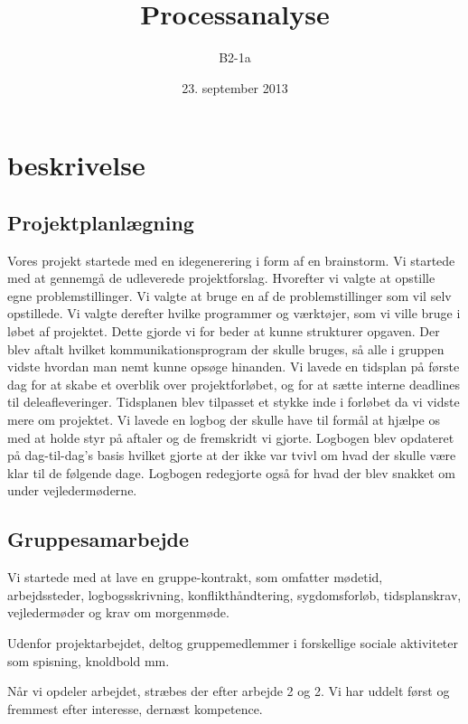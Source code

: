 


\title{Processanalyse}
\author{B2-1a}
\date{23. september 2013}
\maketitle



\section{beskrivelse}

\subsection{Projektplanlægning}

Vores projekt startede med en idegenerering i form af en brainstorm. Vi startede med at gennemgå de udleverede projektforslag. Hvorefter vi valgte at opstille egne problemstillinger. Vi valgte at bruge en af de problemstillinger som vil selv opstillede. 
Vi valgte derefter hvilke programmer og værktøjer, som vi ville bruge i løbet af projektet. Dette gjorde vi for beder at kunne strukturer opgaven.  Der blev aftalt hvilket kommunikationsprogram der skulle bruges, så alle i gruppen vidste hvordan man nemt kunne opsøge hinanden. 
Vi lavede en tidsplan på første dag for at skabe et overblik over projektforløbet, og for at sætte interne deadlines til deleafleveringer. Tidsplanen blev tilpasset et stykke inde i forløbet da vi vidste mere om projektet.
Vi lavede en logbog der skulle have til formål at hjælpe os med at holde styr på aftaler og de fremskridt vi gjorte. Logbogen blev opdateret på dag-til-dag’s basis hvilket gjorte at der ikke var tvivl om hvad der skulle være klar til de følgende dage. Logbogen redegjorte også for hvad der blev snakket om under vejledermøderne. 

\subsection{Gruppesamarbejde}

Vi startede med at lave en gruppe-kontrakt, som omfatter mødetid, arbejdssteder, logbogsskrivning, konflikthåndtering, sygdomsforløb, tidsplanskrav, vejledermøder og krav om morgenmøde.

Udenfor projektarbejdet, deltog gruppemedlemmer i forskellige sociale aktiviteter som spisning, knoldbold mm.

Når vi opdeler arbejdet, stræbes der efter arbejde 2 og 2. Vi har uddelt først og fremmest efter interesse, dernæst kompetence.

